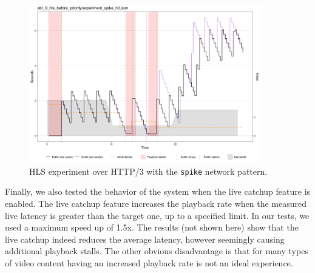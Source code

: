 \begin{figure}[h]
    \centering
    \includegraphics[width=0.9\textwidth]{res/eval_abr_spike_hls.png}
    \caption{HLS experiment over HTTP/3 with the \texttt{spike} network pattern.}
    \label{fig:eval_abr_hls}
\end{figure}

Finally, we also tested the behavior of the system when the live catchup feature is enabled. The live catchup feature increases the playback rate when the measured live latency is greater than the target one, up to a specified limit. In our tests, we used a maximum speed up of 1.5x. The results (not shown here) show that the live catchup indeed reduces the average latency, however seemingly causing additional playback stalls. The other obvious disadvantage is that for many types of video content having an increased playback rate is not an ideal experience.


